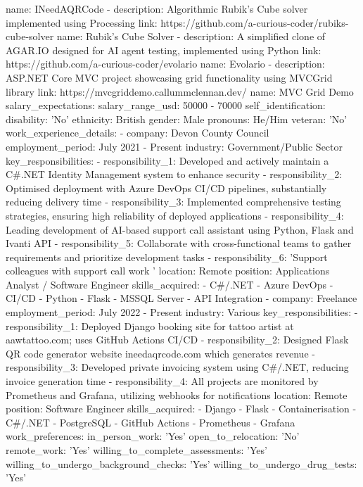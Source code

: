   name: INeedAQRCode
- description: Algorithmic Rubik's Cube solver implemented using Processing
  link: https://github.com/a-curious-coder/rubiks-cube-solver
  name: Rubik's Cube Solver
- description: A simplified clone of AGAR.IO designed for AI agent testing, implemented
    using Python
  link: https://github.com/a-curious-coder/evolario
  name: Evolario
- description: ASP.NET Core MVC project showcasing grid functionality using MVCGrid
    library
  link: https://mvcgriddemo.callummclennan.dev/
  name: MVC Grid Demo
salary_expectations:
  salary_range_usd: 50000 - 70000
self_identification:
  disability: 'No'
  ethnicity: British
  gender: Male
  pronouns: He/Him
  veteran: 'No'
work_experience_details:
- company: Devon County Council
  employment_period: July 2021 - Present
  industry: Government/Public Sector
  key_responsibilities:
  - responsibility_1: Developed and actively maintain a C#.NET Identity Management
      system to enhance security
  - responsibility_2: Optimised deployment with Azure DevOps CI/CD pipelines, substantially
      reducing delivery time
  - responsibility_3: Implemented comprehensive testing strategies, ensuring high
      reliability of deployed applications
  - responsibility_4: Leading development of AI-based support call assistant using
      Python, Flask and Ivanti API
  - responsibility_5: Collaborate with cross-functional teams to gather requirements
      and prioritize development tasks
  - responsibility_6: 'Support colleagues with support call work '
  location: Remote
  position: Applications Analyst / Software Engineer
  skills_acquired:
  - C#/.NET
  - Azure DevOps
  - CI/CD
  - Python
  - Flask
  - MSSQL Server
  - API Integration
- company: Freelance
  employment_period: July 2022 - Present
  industry: Various
  key_responsibilities:
  - responsibility_1: Deployed Django booking site for tattoo artist at aawtattoo.com;
      uses GitHub Actions CI/CD
  - responsibility_2: Designed Flask QR code generator website ineedaqrcode.com which
      generates revenue
  - responsibility_3: Developed private invoicing system using C#/.NET, reducing invoice
      generation time
  - responsibility_4: All projects are monitored by Prometheus and Grafana, utilizing
      webhooks for notifications
  location: Remote
  position: Software Engineer
  skills_acquired:
  - Django
  - Flask
  - Containerisation
  - C#/.NET
  - PostgreSQL
  - GitHub Actions
  - Prometheus
  - Grafana
work_preferences:
  in_person_work: 'Yes'
  open_to_relocation: 'No'
  remote_work: 'Yes'
  willing_to_complete_assessments: 'Yes'
  willing_to_undergo_background_checks: 'Yes'
  willing_to_undergo_drug_tests: 'Yes'


